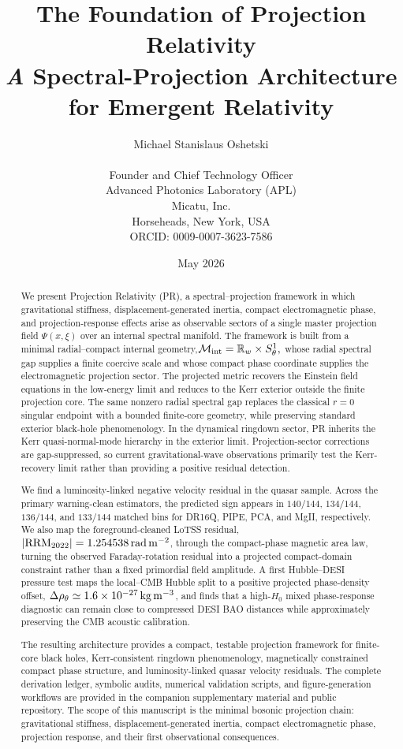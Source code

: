 \documentclass[11pt]{article}
\title{The Foundation of Projection Relativity \\
\Large \textit A Spectral-Projection Architecture for Emergent Relativity}
\author{Michael Stanislaus Oshetski \orcidlink{0009-0007-3623-7586} \\
\small \email{michael.oshetski@micatu.com}\\
\small Founder and Chief Technology Officer \\
\small Advanced Photonics Laboratory (APL)\\
\small Micatu, Inc. \\
\small Horseheads, New York, USA \\
\small ORCID: 0009-0007-3623-7586
\date {May 2026}}
\begin{document}
\maketitle
\begin{abstract}
We present Projection Relativity (PR), a spectral--projection framework in which gravitational stiffness, displacement-generated inertia, compact electromagnetic phase, and projection-response effects arise as observable
sectors of a single master projection field \(\Psi(x,\xi)\) over an internal spectral manifold. The framework is built from a minimal radial--compact internal geometry,$\mathcal M_{\rm int}=\mathbb R_w\times S^1_\theta,$ whose radial spectral gap supplies a finite coercive scale and whose compact phase coordinate supplies the electromagnetic projection sector. The projected metric recovers the Einstein field equations in the low-energy limit and reduces to the Kerr exterior outside the finite projection core. The same nonzero radial spectral gap replaces the
classical \(r=0\) singular endpoint with a bounded finite-core geometry, while preserving standard exterior black-hole phenomenology. In the dynamical ringdown sector, PR inherits the Kerr quasi-normal-mode hierarchy in the exterior limit. Projection-sector corrections are gap-suppressed, so current gravitational-wave observations primarily test the Kerr-recovery limit rather than providing a positive residual detection.

We find a luminosity-linked negative velocity residual in the quasar sample. Across the primary warning-clean estimators, the predicted sign appears in \(140/144\), \(134/144\), \(136/144\), and \(133/144\) matched bins for DR16Q, PIPE, PCA, and MgII, respectively. We also map the foreground-cleaned LoTSS residual, $|{\rm RRM}_{2022}|=1.254538\,{\rm rad\,m^{-2}}$, through the compact-phase magnetic area law, turning the observed Faraday-rotation residual into a projected compact-domain constraint rather than a fixed primordial field amplitude. A first Hubble--DESI pressure test maps the local--CMB Hubble split to a positive projected phase-density offset, \(\Delta\rho_\theta\simeq1.6\times10^{-27}\,{\rm kg\,m^{-3}}\), and finds that a high-\(H_0\) mixed phase-response diagnostic can remain close to compressed DESI BAO distances while approximately preserving the CMB acoustic calibration.

The resulting architecture provides a compact, testable projection framework for finite-core black holes, Kerr-consistent ringdown phenomenology, magnetically constrained compact phase structure, and luminosity-linked quasar velocity residuals. The complete derivation ledger, symbolic audits, numerical validation scripts, and figure-generation workflows are provided in the companion supplementary material and public repository. The scope of this manuscript is the minimal bosonic projection chain: gravitational stiffness, displacement-generated inertia, compact electromagnetic phase, projection response, and their first observational consequences.
\end{abstract}
\end{document}
